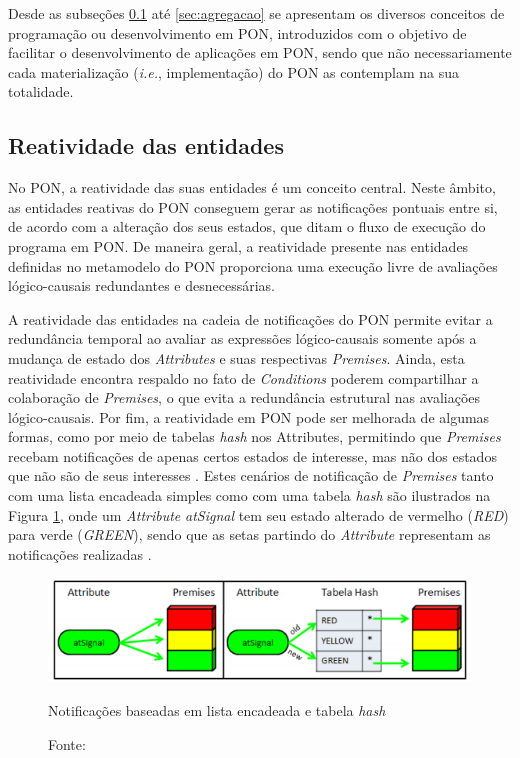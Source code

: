 Desde as subseções \ref{sec:reatividade} até \ref{sec:agregacao} se apresentam
os diversos conceitos de programação ou desenvolvimento em PON, introduzidos com
o objetivo de facilitar o desenvolvimento de aplicações em PON, sendo que não
necessariamente cada materialização (\textit{i.e.}, implementação) do PON as
contemplam na sua totalidade.

\subsection{Reatividade das entidades}\label{sec:reatividade}

No PON, a reatividade das suas entidades é um conceito central. Neste âmbito, as
entidades reativas do PON conseguem gerar as notificações pontuais entre si, de
acordo com a alteração dos seus estados, que ditam o fluxo de execução do
programa em PON. De maneira geral, a reatividade presente nas entidades
definidas no metamodelo do PON proporciona uma execução livre de avaliações
lógico-causais redundantes e desnecessárias. 

A reatividade das entidades na cadeia de notificações do PON permite evitar a
redundância temporal ao avaliar as expressões lógico-causais somente após a
mudança de estado dos \textit{Attributes} e suas respectivas \textit{Premises}.
Ainda, esta reatividade encontra respaldo no fato de \textit{Conditions} poderem
compartilhar a colaboração de \textit{Premises}, o que evita a redundância
estrutural nas avaliações lógico-causais. Por fim, a reatividade em PON pode ser
melhorada de algumas formas, como por meio de tabelas \textit{hash} nos
Attributes, permitindo que \textit{Premises} recebam notificações de apenas
certos estados de interesse, mas não dos estados que não são de seus interesses
\cite{msc_Banaszewski_2009}. Estes cenários de notificação de \textit{Premises}
tanto com uma lista encadeada simples como com uma tabela \textit{hash} são
ilustrados na Figura \ref{fig:hash_not}, onde um \textit{Attribute}
\textit{atSignal} tem seu estado alterado de vermelho (\textit{RED}) para verde
(\textit{GREEN}), sendo que as setas partindo do \textit{Attribute} representam
as notificações realizadas \cite{msc_Banaszewski_2009}.

\begin{figure}[!htb]
  \centering
  \includegraphics[width=\textwidth]{../figures/hash_not.png}
  \smallskip
  \caption{Notificações baseadas em lista encadeada e tabela \textit{hash}}
  \caption*{Fonte: }
  \label{fig:hash_not}
\end{figure}

